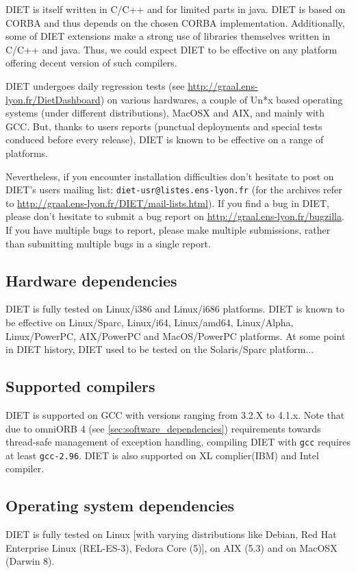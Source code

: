 DIET is itself written in C/C++ and for limited parts in java. DIET is
based on CORBA and thus depends on the chosen CORBA implementation.
Additionally, some of DIET extensions make a strong use of libraries
themselves written in C/C++ and java.
Thus, we could expect DIET to be effective on any platform offering
decent version of such compilers.

DIET undergoes daily regression tests
(see \url{http://graal.ens-lyon.fr/DietDashboard})
on various hardwares, a couple of Un*x based operating systems (under
different distributions), MacOSX and AIX, and mainly with GCC.
But, thanks to users reports (punctual deployments and special tests
conduced before every release), DIET is known to be effective on a
range of platforms.

Nevertheless, if you encounter installation difficulties don't hesitate
to post on DIET's users mailing list: \verb+diet-usr@listes.ens-lyon.fr+
(for the archives refer to \url{http://graal.ens-lyon.fr/DIET/mail-lists.html}).
If you find a bug in DIET, please don't hesitate to submit a bug report on
\url{http://graal.ens-lyon.fr/bugzilla}. If you have multiple bugs
to report, please make multiple submissions, rather than submitting
multiple bugs in a single report.

\subsection{Hardware dependencies}
DIET is fully tested on Linux/i386 and Linux/i686 platforms.
DIET is known to be effective on Linux/Sparc, Linux/i64, Linux/amd64,
Linux/Alpha, Linux/PowerPC, AIX/PowerPC and MacOS/PowerPC platforms.
At some point in DIET history, DIET used to be tested on the Solaris/Sparc
platform...

\subsection{Supported compilers}
DIET is supported on GCC with versions ranging from 3.2.X to 4.1.x.
Note that due to omniORB 4 (see \ref{sec:software_dependencies}) requirements
towards thread-safe management of exception handling, compiling DIET with
\verb+gcc+ requires at least \verb+gcc-2.96+.
DIET is also supported on XL complier(IBM) and Intel compiler.

\subsection{Operating system dependencies}
DIET is fully tested on Linux [with varying distributions like Debian,
Red Hat Enterprise Linux (REL-ES-3), Fedora Core (5)], on AIX (5.3) and on MacOSX
(Darwin 8).

